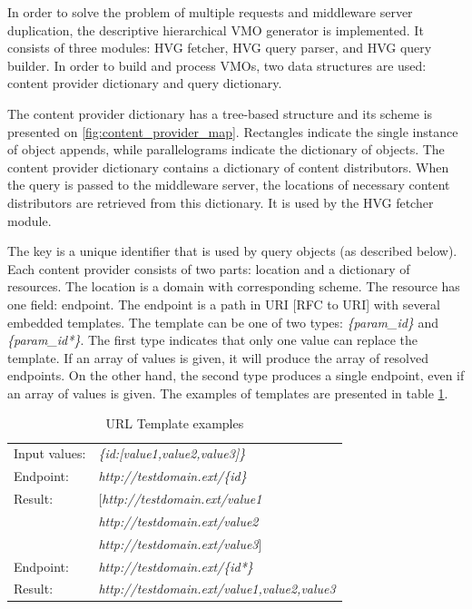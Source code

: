 In order to solve the problem of multiple requests and middleware server duplication, the descriptive hierarchical VMO generator is implemented. It consists of three modules: HVG fetcher, HVG query parser, and HVG query builder. In order to build and process VMOs, two data structures are used: content provider dictionary and query dictionary. 

The content provider dictionary has a tree-based structure and its scheme is presented on \ref{fig:content_provider_map}. Rectangles indicate the single instance of object appends, while parallelograms indicate the dictionary of objects. The content provider dictionary contains a dictionary of content distributors. When the query is passed to the middleware server, the locations of necessary content distributors are retrieved from this dictionary. It is used by the HVG fetcher module.

The key is a unique identifier that is used by query objects (as described below). Each content provider consists of two parts: location and a dictionary of resources. The location is a domain with corresponding scheme. The resource has one field: endpoint. The endpoint is a path in URI [RFC to URI] with several embedded templates. The template can be one of two types: \textit{\{param\_id\}} and \textit{\{param\_id*\}}. The first type indicates that only one value can replace the template. If an array of values is given, it will produce the array of resolved endpoints. On the other hand, the second type produces a single endpoint, even if an array of values is given. The examples of templates are presented in table \ref{table:template_replacement}.


\begin{table}
	 \begin{center}
	  \begin{tabular}{l l}
	    Input values: & \textit{\{id:[value1,value2,value3]\}} \\
	    Endpoint: & \textit{http://testdomain.ext/\{id\}}  \\ 
	    Result: & [\textit{http://testdomain.ext/value1}   \\
	    		&  \textit{http://testdomain.ext/value2}   \\
	    		&  \textit{http://testdomain.ext/value3}]  \\
	    Endpoint: & \textit{http://testdomain.ext/\{id*\}} \\
	    Result: &  \textit{http://testdomain.ext/value1,value2,value3}
	  \end{tabular}
	 \label{table:template_replacement}
	 \caption{URL Template examples}
	\end{center}
\end{table}

